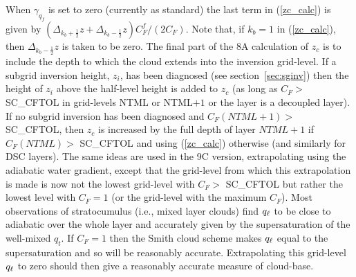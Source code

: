 \documentclass{UMDP_article}
\begin{document}
When $\gamma_{q_f}$ is set to zero (currently as standard) the last
term in (\ref{zc_calc}) is given by
$(\Delta_{k_b+\frac{1}{2}}z+\Delta_{k_b-\frac{1}{2}}z)C_F^f/(2C_F)$.
Note that, if $k_b=1$ in (\ref{zc_calc}), then
$\Delta_{k_b-\frac{1}{2}}z$ is taken to be zero.  The final part of
the 8A calculation of $z_c$ is to include the depth to which the cloud
extends into the inversion grid-level.  If a subgrid inversion height,
$z_i$, has been diagnosed (see section~\ref{sec:sginv}) then the
height of $z_i$ above the half-level height is added to $z_c$ (as long
as $C_F>$ SC\_CFTOL in grid-levels NTML or NTML$+1$ or the layer is a
decoupled layer).  If no subgrid inversion has been diagnosed and
$C_F(NTML+1)>$ SC\_CFTOL, then $z_c$ is increased by the full depth of
layer $NTML+1$ if $C_F(NTML)>$ SC\_CFTOL and using (\ref{zc_calc})
otherwise (and similarly for DSC layers).  The same ideas are used in
the 9C version, extrapolating using the adiabatic
water gradient, except that the grid-level from which this
extrapolation is made is now not the lowest grid-level with $C_F > $
SC\_CFTOL but rather the lowest level with $C_F=1$ (or the grid-level
with the maximum $C_F$). Most observations of stratocumulus (i.e.,
mixed layer clouds) find $q_{\ell}$ to be close to adiabatic over the whole
layer and accurately given by the supersaturation of the well-mixed
$q_t$. If $C_F=1$ then the Smith cloud scheme makes $q_{\ell}$ equal to the
supersaturation and so will be reasonably accurate. Extrapolating this
grid-level $q_{\ell}$ to zero should then give a reasonably accurate
measure of cloud-base.
\end{document}
